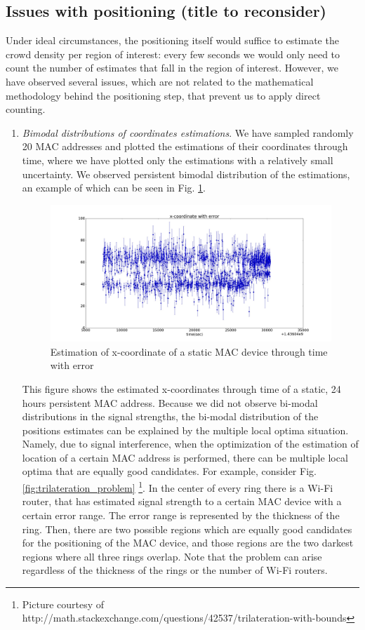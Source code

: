 \documentclass[10pt,a4paper]{article}
\begin{document}
\subsection{Issues with positioning (title to reconsider)}

Under ideal circumstances, the positioning itself would suffice to estimate the crowd density per region of interest:  every few seconds we would only need to count the number of estimates that fall in the region of interest. However, we have observed several issues, which are not related to the mathematical methodology behind the positioning step, that prevent us to apply direct counting. 
\begin{enumerate}
	\item
	{\it Bimodal distributions of coordinates estimations}. We have sampled randomly 20 MAC addresses and plotted the estimations of their coordinates through time, where we have plotted only the estimations with a relatively small uncertainty. We observed persistent bimodal distribution of the estimations, an example of which can be seen in Fig. \ref{fig:bimodal}. 
		\begin{figure}[h!]
			\centering
			\includegraphics[width=120mm]{bimodal.jpg}
			\caption{Estimation of x-coordinate of a static MAC device through time with error}
			\label{fig:bimodal}
		\end{figure} 
	This figure shows the estimated x-coordinates through time of a static, 24 hours persistent MAC address. Because we did not observe  bi-modal distributions in the signal strengths, the bi-modal distribution of the positions estimates can be explained by the multiple local optima situation. Namely, due to signal interference, when the optimization of the estimation of location of a certain MAC address is performed, there can be multiple local optima that are equally good candidates. For example, consider Fig. \ref{fig:trilateration_problem} \footnote{Picture courtesy of http://math.stackexchange.com/questions/42537/trilateration-with-bounds}. In the center of every ring there is a Wi-Fi router, that has estimated signal strength to a certain MAC device with a certain error range. The error range is represented by the thickness of the ring. Then, there are two possible regions which are equally good candidates for the positioning of the MAC device, and those regions are the two darkest regions where all three rings overlap. Note that the problem can arise regardless of the thickness of the rings or the number of Wi-Fi routers. 	

\end{enumerate}
\end{document}
